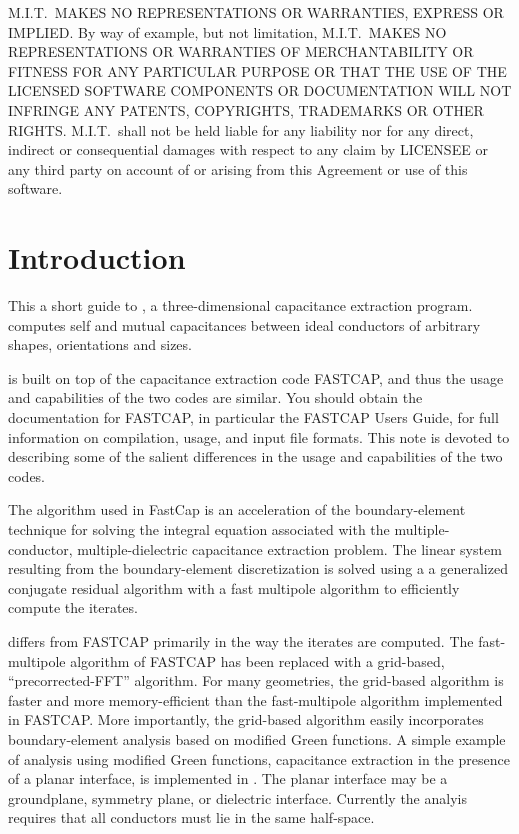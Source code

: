 \begin{titlepage}
\vspace{\baselineskip}
\noindent M.I.T.\ MAKES NO REPRESENTATIONS OR WARRANTIES, 
EXPRESS OR IMPLIED.  By
way of example, but not limitation, M.I.T.\ MAKES NO REPRESENTATIONS OR
WARRANTIES OF MERCHANTABILITY OR FITNESS FOR ANY PARTICULAR PURPOSE OR
THAT THE USE OF THE LICENSED SOFTWARE COMPONENTS OR DOCUMENTATION WILL
NOT INFRINGE ANY PATENTS, COPYRIGHTS, TRADEMARKS OR OTHER RIGHTS.
M.I.T.\ shall not be held liable for any liability nor for any direct,
indirect or consequential damages with respect to any claim by LICENSEE
or any third party on account of or arising from this Agreement or use
of this software.

\end{titlepage}

\setcounter{page}{1}

\section{Introduction}

This a short guide to \thecode, a three-dimensional capacitance
extraction program.  \thecode computes self and mutual capacitances
between ideal conductors of
arbitrary shapes, orientations and sizes.  

\thecode is built on top of the capacitance extraction code FASTCAP, and
thus the usage and capabilities of the two codes are similar.  You should
obtain the documentation for FASTCAP, in particular the FASTCAP Users
Guide, for full information on compilation, usage, and input file formats.
This note is devoted to describing some of the salient differences in the
usage and capabilities of the two codes. 

The algorithm used in
FastCap is an acceleration of the boundary-element technique for
solving the integral equation associated with the multiple-conductor,
multiple-dielectric
capacitance extraction problem.  
The linear system resulting  from the boundary-element discretization
is solved using a
a generalized conjugate
residual algorithm with a fast multipole algorithm to efficiently
compute the iterates.

\thecode differs from FASTCAP primarily in the way the iterates are
computed.  The fast-multipole algorithm of FASTCAP has been replaced with
a grid-based, ``precorrected-FFT'' algorithm.   For many geometries, the
grid-based algorithm is faster and more memory-efficient than the
fast-multipole algorithm implemented in FASTCAP.  More importantly, the
grid-based algorithm easily incorporates boundary-element analysis based on
modified Green functions.  A simple example of analysis using modified
Green functions, capacitance extraction in the presence of a planar
interface, is implemented in \thecode.    The planar interface may
be a groundplane, symmetry plane, or dielectric interface.  Currently the
analyis requires that all conductors must lie in the same half-space. 


